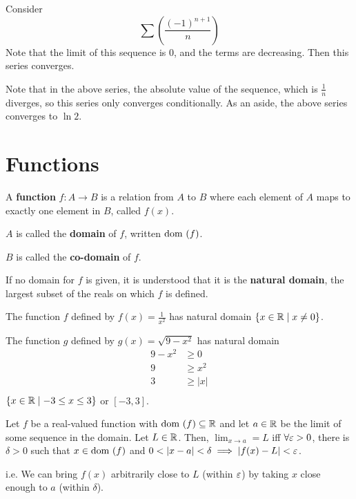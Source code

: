 \documentclass{article}
\begin{document}
\begin{example}
Consider \[\sum \left(\frac{(-1)^{n+1}}{n}\right)\] Note that the limit of this sequence is $0$, and the terms are decreasing. Then this series converges.
\end{example}
\begin{remark}
Note that in the above series, the absolute value of the sequence, which is $\frac{1}{n}$ diverges, so this series only converges conditionally.
As an aside, the above series converges to $\ln 2$.
\end{remark}

\section{Functions}
\begin{definition}
A \textbf{function} $f: A \to B$ is a relation from $A$ to $B$ where each element of $A$ maps to exactly one element in $B$, called $f(x)$. 

$A$ is called the \textbf{domain} of $f$, written $\text{dom }(f)$.

$B$ is called the \textbf{co-domain} of $f$.

If no domain for $f$ is given, it is understood that it is the \textbf{natural domain}, the largest subset of the reals on which $f$ is defined.
\end{definition}
\begin{example}
The function $f$ defined by $f(x) = \frac{1}{x^2}$ has natural domain $\{x \in \mathbb{R} \mid x \not = 0 \}$.

The function $g$ defined by $g(x) = \sqrt{9-x^2}$ has natural domain \begin{align*}
    9 - x^2 &\geq 0\\
    9 &\geq x^2\\
    3 &\geq |x|\\
\end{align*}
$\{x \in \mathbb{R} \mid -3 \leq x \leq 3 \}$ or $[-3, 3]$.
\end{example}
\begin{definition}
Let $f$ be a real-valued function with $\text{dom }(f) \subseteq \mathbb{R}$ and let $a \in \mathbb{R}$ be the limit of some sequence in the domain. Let $L \in \mathbb{R}$.
Then, $\lim_{x\to a} = L$ iff $\forall \varepsilon > 0$, there is $\delta > 0$ such that $x \in \text{dom }(f)$ and $0 < \abs{x -a} < \delta \implies \abs{f(x) - L} < \varepsilon$.

i.e. We can bring $f(x)$ arbitrarily close to $L$ (within $\varepsilon$) by taking $x$ close enough to $a$ (within $\delta$).
\end{definition}
\end{document}
